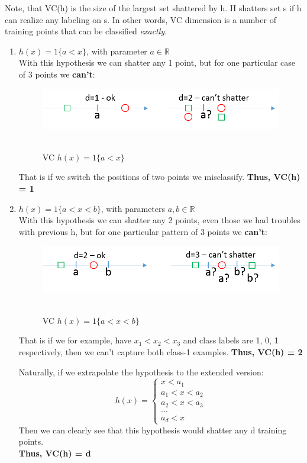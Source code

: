 \documentclass{article}
\begin{document}
Note, that VC(h) is the size of the largest set shattered by h. H shatters set s if h can realize any labeling on s. In other words, VC dimension is a number of training points that can be classified \textit{exactly}. 
\begin{enumerate}
\item $h(x)=1\{a < x \}$, with parameter $a \in 	\mathbb{R}$\\
With this hypothesis we can shatter any 1 point, but for one particular case of 3 points we \textbf{can't}:\\
\begin{figure}[!htb]
	\centering
	\includegraphics[width=5in,clip,keepaspectratio]{vc_1.png}\
	\caption{VC $h(x)=1\{a < x \}$}	
\end{figure}

That is if we switch the positions of two points we misclassify.
\textbf{Thus, VC(h) = 1}

\item $h(x)=1\{a < x < b\}$, with parameters $a, b \in 	\mathbb{R}$\\
With this hypothesis we can shatter any 2 points, even those we had troubles with previous h, but for one particular pattern of 3 points we \textbf{can't}:\\
\begin{figure}[!htb]
	\centering
	\includegraphics[width=5in,clip,keepaspectratio]{vc_2.png}\
	\caption{VC $h(x)=1\{a < x < b\}$}	
\end{figure}

That is if we for example, have $x_1<x_2<x_3$ and class labels are 1, 0, 1 respectively, then we can't capture both class-1 examples.
\textbf{Thus, VC(h) = 2}

Naturally, if we extrapolate the hypothesis to the extended version:
\begin{displaymath}
	h(x) = \left\{
	\begin{array}{l}
		x < a_1\\
		a_1 < x < a_2\\
		a_2 < x < a_3\\
		...\\
		a_d < x
	\end{array}
	\right.
\end{displaymath}
Then we can clearly see that this hypothesis would shatter any d training points. \\
\textbf{Thus, VC(h) = d}\\


\end{enumerate}
\end{document}
